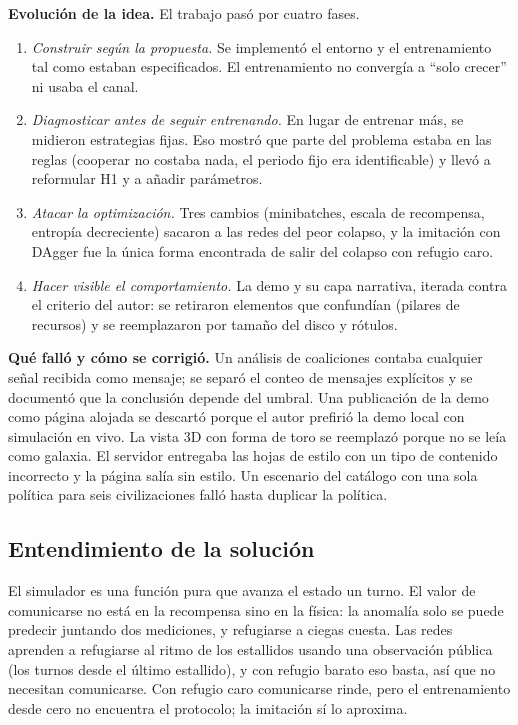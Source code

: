 \documentclass[11pt,a4paper]{article}
\begin{document}
\textbf{Evoluci\'on de la idea.} El trabajo pas\'o por cuatro fases.

\begin{enumerate}
\item \emph{Construir seg\'un la propuesta.} Se implement\'o el entorno y el entrenamiento tal como estaban especificados. El entrenamiento no converg\'ia a ``solo crecer'' ni usaba el canal.
\item \emph{Diagnosticar antes de seguir entrenando.} En lugar de entrenar m\'as, se midieron estrategias fijas. Eso mostr\'o que parte del problema estaba en las reglas (cooperar no costaba nada, el periodo fijo era identificable) y llev\'o a reformular H1 y a a\~nadir par\'ametros.
\item \emph{Atacar la optimizaci\'on.} Tres cambios (minibatches, escala de recompensa, entrop\'ia decreciente) sacaron a las redes del peor colapso, y la imitaci\'on con DAgger fue la \'unica forma encontrada de salir del colapso con refugio caro.
\item \emph{Hacer visible el comportamiento.} La demo y su capa narrativa, iterada contra el criterio del autor: se retiraron elementos que confund\'ian (pilares de recursos) y se reemplazaron por tama\~no del disco y r\'otulos.
\end{enumerate}

\textbf{Qu\'e fall\'o y c\'omo se corrigi\'o.} Un an\'alisis de coaliciones contaba cualquier se\~nal recibida como mensaje; se separ\'o el conteo de mensajes expl\'icitos y se document\'o que la conclusi\'on depende del umbral. Una publicaci\'on de la demo como p\'agina alojada se descart\'o porque el autor prefiri\'o la demo local con simulaci\'on en vivo. La vista 3D con forma de toro se reemplaz\'o porque no se le\'ia como galaxia. El servidor entregaba las hojas de estilo con un tipo de contenido incorrecto y la p\'agina sal\'ia sin estilo. Un escenario del cat\'alogo con una sola pol\'itica para seis civilizaciones fall\'o hasta duplicar la pol\'itica.

\subsection{Entendimiento de la soluci\'on}

El simulador es una funci\'on pura que avanza el estado un turno. El valor de comunicarse no est\'a en la recompensa sino en la f\'isica: la anomal\'ia solo se puede predecir juntando dos mediciones, y refugiarse a ciegas cuesta. Las redes aprenden a refugiarse al ritmo de los estallidos usando una observaci\'on p\'ublica (los turnos desde el \'ultimo estallido), y con refugio barato eso basta, as\'i que no necesitan comunicarse. Con refugio caro comunicarse rinde, pero el entrenamiento desde cero no encuentra el protocolo; la imitaci\'on s\'i lo aproxima.
\end{document}
